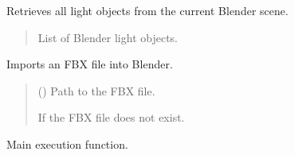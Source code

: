 \documentclass[letterpaper,10pt,english]{sphinxmanual}
\begin{document}

\begin{fulllineitems}
\label{\detokenize{blender_export:blender_export.get_lights}}
\pysigstartsignatures
\pysiglinewithargsret
{}
{}
{}
\pysigstopsignatures
\sphinxAtStartPar
Retrieves all light objects from the current Blender scene.
\begin{quote}\begin{description}
\sphinxAtStartPar
List of Blender light objects.

\end{description}\end{quote}

\end{fulllineitems}


\begin{fulllineitems}
\label{\detokenize{blender_export:blender_export.import_fbx}}
\pysigstartsignatures
\pysiglinewithargsret
{}
{}
{}
\pysigstopsignatures
\sphinxAtStartPar
Imports an FBX file into Blender.
\begin{quote}\begin{description}
\sphinxAtStartPar
{} () \textendash{} Path to the FBX file.

\sphinxAtStartPar
{} \textendash{} If the FBX file does not exist.

\end{description}\end{quote}

\end{fulllineitems}


\begin{fulllineitems}
\label{\detokenize{blender_export:blender_export.main}}
\pysigstartsignatures
\pysiglinewithargsret
{}
{}
{}
\pysigstopsignatures
\sphinxAtStartPar
Main execution function.

\end{fulllineitems}
\end{document}
